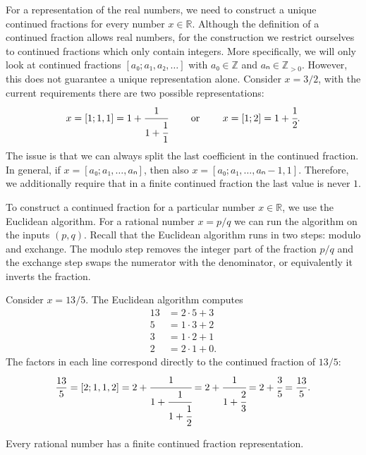 For a representation of the real numbers,
we need to construct a unique continued fractions for every number $x ∈ ℝ$.
Although the definition of a continued fraction allows real numbers,
for the construction we restrict ourselves to continued fractions which only
contain integers.
More specifically, we will only look at continued fractions $[a₀; a₁, a₂, …]$
with $a₀ ∈ ℤ$ and $aₙ ∈ ℤ_{> 0}$.
However, this does not guarantee a unique representation alone.
Consider $x = 3/2$, with the current requirements there are two possible representations:
\[
  x = [1; 1, 1] = 1 + \cfrac{1}{1 + \cfrac{1}{1}} \qquad \text{ or } \qquad x = [1; 2] = 1 + \cfrac{1}{2}.
\]
The issue is that we can always split the last coefficient in the continued fraction.
In general, if $x = [a₀; a₁, …, aₙ]$, then also $x = [a₀; a₁, …, aₙ - 1, 1]$.
Therefore, we additionally require that in a finite continued fraction the last value is never $1$.

To construct a continued fraction for a particular number $x ∈ ℝ$,
we use the Euclidean algorithm.
For a rational number $x = p/q$ we can run the algorithm
on the inputs $(p, q)$.
Recall that the Euclidean algorithm runs in two steps: modulo and exchange.
The modulo step removes the integer part of the fraction $p/q$
and the exchange step swaps the numerator with the denominator,
or equivalently it inverts the fraction.

\begin{example}
  Consider $x = 13/5$.
  The Euclidean algorithm computes
  \begin{align*}
    13 & = 2 · 5 + 3 \\
     5 & = 1 · 3 + 2 \\
     3 & = 1 · 2 + 1 \\
     2 & = 2 · 1 + 0.
  \end{align*}
  The factors in each line correspond directly to the continued fraction of $13/5$:
  \[
    \frac{13}{5}
    = [2; 1, 1, 2]
    = 2 + \cfrac{1}{1 + \cfrac{1}{1 + \cfrac{1}{2}}}
    = 2 + \cfrac{1}{1 + \cfrac{2}{3}}
    = 2 + \cfrac{3}{5}
    = \frac{13}{5}.
  \]
\end{example}

\begin{theorem}
  \label{thm:rat-cf}
  Every rational number has a finite continued fraction representation.
\end{theorem}

